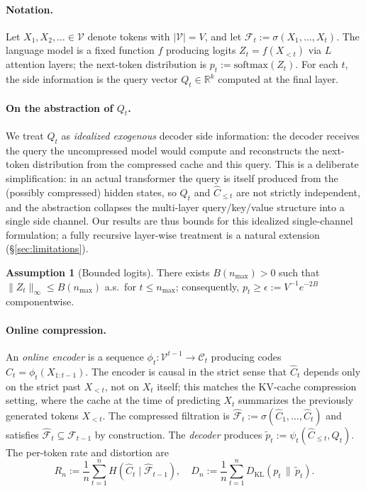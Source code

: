 \documentclass[11pt]{article}
\newcommand{\V}{\mathcal{V}}
\newcommand{\R}{\mathbb{R}}
\newcommand{\F}{\mathcal{F}}
\newcommand{\Fhat}{\hat{\F}}
\newcommand{\Chat}{\hat{C}}
\newcommand{\KL}[2]{D_{\mathrm{KL}}(#1 \,\|\, #2)}
\theoremstyle{plain}
\theoremstyle{definition}
\newtheorem{assumption}[theorem]{Assumption}
\theoremstyle{remark}
\begin{document}
\paragraph{Notation.}
Let $X_1, X_2, \ldots \in \V$ denote tokens with $|\V| = V$, and let
$\F_t := \sigma(X_1, \ldots, X_t)$. The language model is a fixed
function $f$ producing logits $Z_t = f(X_{<t})$ via $L$ attention
layers; the next-token distribution is $p_t := \mathrm{softmax}(Z_t)$.
For each $t$, the side information is the query vector
$Q_t \in \R^k$ computed at the final layer.

\paragraph{On the abstraction of $Q_t$.}
We treat $Q_t$ as \emph{idealized exogenous} decoder side
information: the decoder receives the query the uncompressed model
would compute and reconstructs the next-token distribution from the
compressed cache and this query. This is a deliberate simplification:
in an actual transformer the query is itself produced from the
(possibly compressed) hidden states, so $Q_t$ and $\Chat_{\leq t}$
are not strictly independent, and the abstraction collapses the
multi-layer query/key/value structure into a single side channel.
Our results are thus bounds for this idealized single-channel
formulation; a fully recursive layer-wise treatment is a natural
extension (\S\ref{sec:limitations}).

\begin{assumption}[Bounded logits]\label{ass:bounded-logits}
There exists $B(n_{\max}) > 0$ such that
$\|Z_t\|_\infty \leq B(n_{\max})$ a.s.\ for $t \leq n_{\max}$;
consequently, $p_t \geq \epsilon := V^{-1}e^{-2B}$ componentwise.
\end{assumption}

\paragraph{Online compression.}
An \emph{online encoder} is a sequence
$\phi_t : \V^{t-1} \to \mathcal{C}_t$ producing codes
$\Chat_t = \phi_t(X_{1:t-1})$. The encoder is causal in the strict
sense that $\Chat_t$ depends only on the strict past $X_{<t}$, not on
$X_t$ itself; this matches the KV-cache compression setting, where
the cache at the time of predicting $X_t$ summarizes the previously
generated tokens $X_{<t}$. The compressed filtration is
$\Fhat_t := \sigma(\Chat_1, \ldots, \Chat_t)$ and satisfies
$\Fhat_t \subseteq \F_{t-1}$ by construction. The \emph{decoder}
produces $\tilde p_t := \psi_t(\Chat_{\leq t}, Q_t)$. The per-token
rate and distortion are
\[
R_n := \frac{1}{n}\sum_{t=1}^n H(\Chat_t \mid \Fhat_{t-1}),
\quad
D_n := \frac{1}{n}\sum_{t=1}^n \KL{p_t}{\tilde p_t}.
\]
\end{document}
